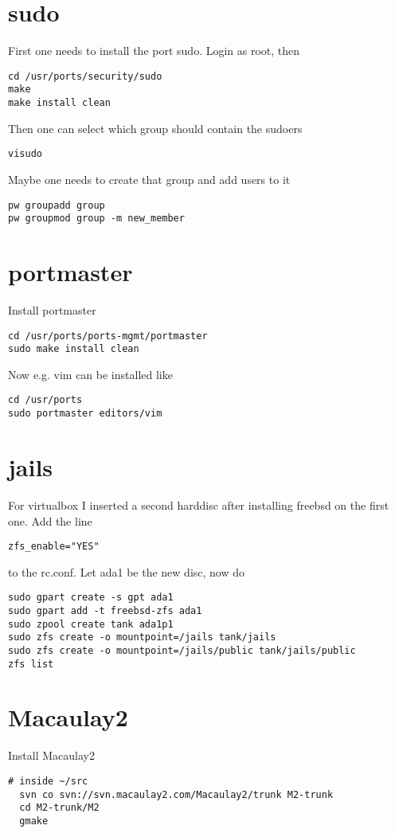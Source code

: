 \documentclass[a4paper]{article}
\begin{document}
\section{sudo}

First one needs to install the port sudo. Login as root, then

\begin{verbatim}
cd /usr/ports/security/sudo
make
make install clean
\end{verbatim}

Then one can select which group should contain the sudoers

\begin{verbatim}
visudo
\end{verbatim}

Maybe one needs to create that group and add users to it

\begin{verbatim}
pw groupadd group
pw groupmod group -m new_member
\end{verbatim}

\section{portmaster}
Install portmaster

\begin{verbatim}
cd /usr/ports/ports-mgmt/portmaster
sudo make install clean
\end{verbatim}

Now e.g. vim can be installed like

\begin{verbatim}
cd /usr/ports
sudo portmaster editors/vim
\end{verbatim}

\section{jails}
For virtualbox I inserted a second harddisc after installing freebsd on the first one.
Add the line

\begin{verbatim}
zfs_enable="YES"
\end{verbatim}

to the rc.conf.
Let ada1 be the new disc, now do

\begin{verbatim}
sudo gpart create -s gpt ada1
sudo gpart add -t freebsd-zfs ada1
sudo zpool create tank ada1p1
sudo zfs create -o mountpoint=/jails tank/jails
sudo zfs create -o mountpoint=/jails/public tank/jails/public
zfs list
\end{verbatim}

\section{Macaulay2}
Install Macaulay2

\begin{verbatim}
# inside ~/src
  svn co svn://svn.macaulay2.com/Macaulay2/trunk M2-trunk
  cd M2-trunk/M2
  gmake

\end{verbatim}
\end{document}
